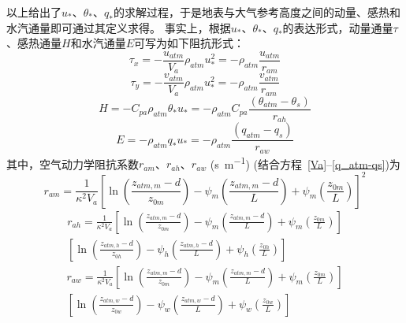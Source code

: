 以上给出了$u_\ast$、$\theta_\ast$、$q_\ast$的求解过程，于是地表与大气参考高度之间的动量、感热和水汽通量即可通过其定义求得。
事实上，根据$u_\ast$、$\theta_\ast$、$q_\ast$的表达形式，动量通量$\tau$、感热通量$H$和水汽通量$E$可写为如下阻抗形式：
\begin{equation}
\tau_{x}=-\frac{u_{atm}}{V_{a}} \rho_{atm} u_{*}^{2}=-\rho_{atm} \frac{u_{atm}}{r_{a m}}
\end{equation}
\begin{equation}
\tau_{y}=-\frac{v_{atm}}{V_{a}} \rho_{atm} u_{*}^{2}=-\rho_{atm} \frac{v_{atm}}{r_{a m}}
\end{equation}
\begin{equation}\label{SH}
H=-C_{p a} \rho_{atm} \theta_{*} u_{*}=-\rho_{atm} C_{p a} \frac{\left(\theta_{atm}-\theta_{s}\right)}{r_{a h}}
\end{equation}
\begin{equation}\label{LH}
E=-\rho_{atm} q_{*} u_{*}=-\rho_{atm} \frac{\left(q_{atm}-q_{s}\right)}{r_{a w}}
\end{equation}
其中，空气动力学阻抗系数$r_{am}$、$r_{ah}$、$r_{aw}$ (\unit{s.m^{-1}}) (结合方程~\eqref{Va}--\eqref{q_atm-qs})为
\begin{equation}\label{ram}
r_{a m}=\frac{1}{\kappa^{2} V_{a}}\left[\ln \left(\frac{z_{atm, m}-d}{z_{0 m}}\right)-\psi_{m}\left(\frac{z_{atm, m}-d}{L}\right)+\psi_{m}\left(\frac{z_{0 m}}{L}\right)\right]^{2}
\end{equation}
\begin{equation}\label{rah}
\begin{array}{c}r_{a h}=\frac{1}{\kappa^{2} V_{a}}\left[\ln \left(\frac{z_{atm, m}-d}{z_{0 m}}\right)-\psi_{m}\left(\frac{z_{atm, m}-d}{L}\right)+\psi_{m}\left(\frac{z_{0 m}}{L}\right)\right] \\ {\left[\ln \left(\frac{z_{atm, h}-d}{z_{0 h}}\right)-\psi_{h}\left(\frac{z_{atm, h}-d}{L}\right)+\psi_{h}\left(\frac{z_{0 h}}{L}\right)\right]}\end{array}
\end{equation}
\begin{equation}\label{raw}
\begin{array}{c}r_{a w}=\frac{1}{\kappa^{2} V_{a}}\left[\ln \left(\frac{z_{atm, m}-d}{z_{0 m}}\right)-\psi_{m}\left(\frac{z_{atm, m}-d}{L}\right)+\psi_{m}\left(\frac{z_{0 m}}{L}\right)\right] \\ {\left[\ln \left(\frac{z_{atm, w}-d}{z_{0 w}}\right)-\psi_{w}\left(\frac{z_{atm, w}-d}{L}\right)+\psi_{w}\left(\frac{z_{0 w}}{L}\right)\right]}\end{array}
\end{equation}

